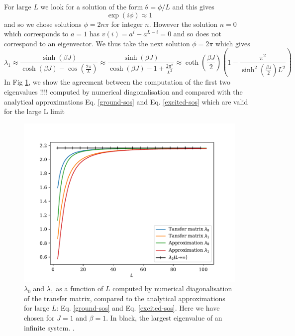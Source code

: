 For large $L$ we look for a solution of the form $\theta=\phi/L$ and this gives
\begin{equation}
\exp(i\phi) \approx 1
\end{equation}
and so we chose solutions $\phi = 2n\pi$ for integer $n$. However the solution $n=0$ which corresponds to $a=1$ has $v(i) = a^i-a^{L-i} =0$ and so does not correspond to an eigenvector. We thus take the next solution $\phi = 2\pi$ which gives
\begin{equation}
\lambda_1 \approx \frac{\sinh(\beta J)}{\cosh(\beta J) - \cos(\frac{2\pi}{L})} \approx \frac{\sinh(\beta J)}{\cosh(\beta J) - 1+ \frac{2\pi^2}{L^2}}\approx \coth(\frac{\beta J}{2})(1 - \frac{\pi^2}{\sinh^2(\frac{\beta J}{2}) L^2})
\label{excited-sos}
\end{equation}
In Fig \ref{large-l-limit}, we show the agreement between the computation of the first two eigenvalues !!!! computed by numerical diagonalisation and compared with the analytical approximations Eq. \eqref{ground-sos} and Eq. \eqref{excited-sos} which are valid for the large L limit
\begin{figure}
\centering
\includegraphics[width=0.7\linewidth]{int-dyn/null_deanJ.pdf}
\caption{$\lambda_0$ and $\lambda_1$ as a function of $L$ computed by numerical diagonalisation of the transfer matrix, compared to the analytical approximations for large $L$: Eq. \eqref{ground-sos} and Eq. \eqref{excited-sos}. Here we have chosen  for $J=1$ and $\beta=1$. In black, the largest eigenvalue of an infinite system. \cite{guyer_sine-gordon_1979}.}
\label{large-l-limit} 
\end{figure}

